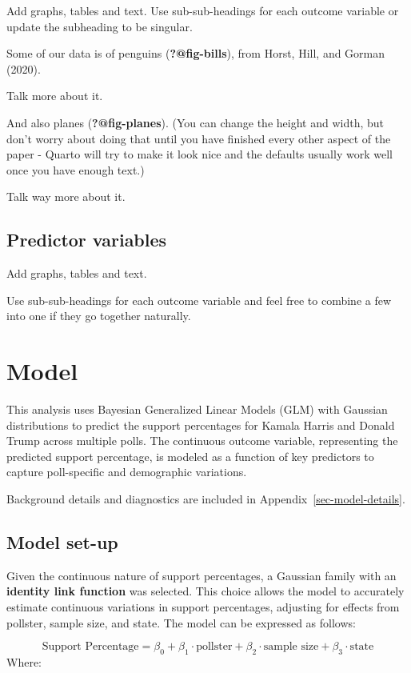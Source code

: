 \documentclass[
  letterpaper,
  DIV=11,
  numbers=noendperiod]{scrartcl}
\begin{document}
Add graphs, tables and text. Use sub-sub-headings for each outcome
variable or update the subheading to be singular.

Some of our data is of penguins (\textbf{?@fig-bills}), from Horst,
Hill, and Gorman (2020).

Talk more about it.

And also planes (\textbf{?@fig-planes}). (You can change the height and
width, but don't worry about doing that until you have finished every
other aspect of the paper - Quarto will try to make it look nice and the
defaults usually work well once you have enough text.)

Talk way more about it.

\subsection{Predictor variables}\label{predictor-variables}

Add graphs, tables and text.

Use sub-sub-headings for each outcome variable and feel free to combine
a few into one if they go together naturally.

\section{Model}\label{model}

This analysis uses Bayesian Generalized Linear Models (GLM) with
Gaussian distributions to predict the support percentages for Kamala
Harris and Donald Trump across multiple polls. The continuous outcome
variable, representing the predicted support percentage, is modeled as a
function of key predictors to capture poll-specific and demographic
variations.

Background details and diagnostics are included in
Appendix~\ref{sec-model-details}.

\subsection{Model set-up}\label{model-set-up}

Given the continuous nature of support percentages, a Gaussian family
with an \textbf{identity link function} was selected. This choice allows
the model to accurately estimate continuous variations in support
percentages, adjusting for effects from pollster, sample size, and
state. The model can be expressed as follows:

\[\text{Support Percentage} = \beta_0 + \beta_1 \cdot \text{pollster} + \beta_2 \cdot \text{sample size} + \beta_3 \cdot \text{state}\]
Where:
\end{document}
